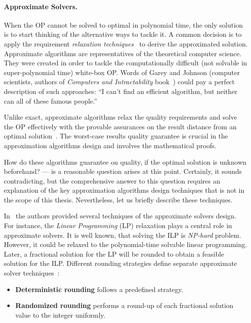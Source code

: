 \paragraph{Approximate Solvers.} When the OP cannot be solved to optimal in polynomial time, the only solution is to start thinking of the alternative ways to tackle it. A common decision is to apply the requirement \emph{relaxation techniques}~\cite{roubivcek2011relaxation} to derive the approximated solution.
Approximate algorithms are representatives of the theoretical computer science. They were created in order to tackle the computationally difficult (not solvable in super-polynomial time) white-box OP. Words of Garey and Johnson (computer scientists, authors of \textit{Computers and Intractability} book~\cite{garey1979computers}) could pay a perfect description of such approaches: ``I can't find an efficient algorithm, but neither can all of these famous people.''

Unlike exact, approximate algorithms relax the quality requirements and solve the OP effectively with the provable assurances on the result distance from an optimal solution~\cite{williamson2011design}. The worst-case results quality guarantee is crucial in the approximation algorithms design and involves the mathematical proofs.

How do these algorithms guarantee on quality, if the optimal solution is unknown beforehand? — is a reasonable question arises at this point. Certainly, it sounds contradicting, but the comprehensive answer to this question requires an explanation of the key approximation algorithms design techniques that is not in the scope of this thesis. Nevertheless, let us briefly describe these techniques.

In~\cite{williamson2011design} the authors provided several techniques of the approximate solvers design. For instance, the \emph{Linear Programming} (LP) relaxation plays a central role in approximate solvers. It is well known, that solving the ILP is \textit{NP-hard} problem. However, it could be relaxed to the polynomial-time solvable linear programming. %
Later, a fractional solution for the LP will be rounded to obtain a feasible solution for the ILP. %
Different rounding strategies define separate approximate solver techniques~\cite{williamson2011design}: 
\begin{itemize}
	\item \textbf{Deterministic rounding} follows a predefined strategy.
	\item \textbf{Randomized rounding} performs a round-up of each fractional solution value to the integer uniformly.
\end{itemize}

